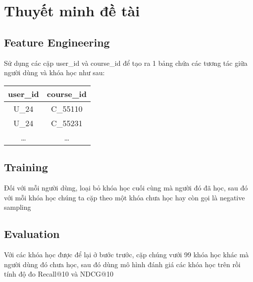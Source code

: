 \section{Thuyết minh đề tài}
\subsection{Feature Engineering}
Sử dụng các cặp user\_id và course\_id để tạo ra 1 bảng chứa các tương tác giữa
người dùng và khóa học như sau:

\begin{center}
\begin{tabular}{cc}
    user\_id & course\_id \\
    \toprule
    U\_24 & C\_55110 \\
    U\_24 & C\_55231 \\
    \ldots & \ldots
\end{tabular}
\end{center}

\subsection{Training}
Đối với mỗi người dùng, loại bỏ khóa học cuối cùng mà người đó đã học, sau đó
với mỗi khóa học chúng ta cặp theo một khóa chưa học hay còn gọi là negative
sampling

\subsection{Evaluation}
Với các khóa học được để lại ở bước trước, cặp chúng vưới 99 khóa học khác mà
người dùng đó chưa học, sau đó dùng mô hình đánh giá các khóa học trên rồi tính
độ đo Recall@10 và NDCG@10
